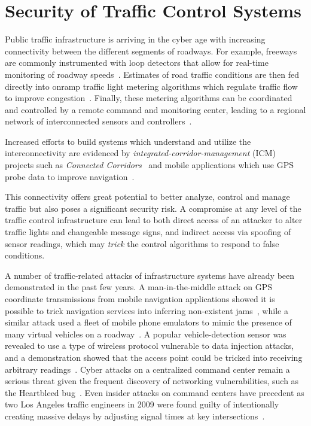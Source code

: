 \chapter{Security of Traffic Control Systems}
\label{chapter:security}

Public traffic infrastructure is arriving in the cyber age with increasing connectivity between the different segments of roadways. For example, freeways are commonly instrumented with loop detectors that allow for real-time monitoring of roadway speeds~\cite{jia2001pems}. Estimates of road traffic conditions are then fed directly into onramp traffic light metering algorithms which regulate traffic flow to improve congestion~\cite{Papageorgiou1991}. Finally, these metering algorithms can be coordinated and controlled by a remote command and monitoring center, leading to a regional network of interconnected sensors and controllers~\cite{Reilly2013b}.

Increased efforts to build systems which understand and utilize the interconnectivity are evidenced by \emph{integrated-corridor-management} (ICM) projects such as \emph{Connected Corridors}~\cite{miller2010san} and mobile applications which use GPS probe data to improve navigation~\cite{work2010traffic}.

This connectivity offers great potential to better analyze, control and manage traffic but also poses a significant security risk. A compromise at any level of the traffic control infrastructure can lead to both direct access of an attacker to alter traffic lights and changeable message signs, and indirect access via spoofing of sensor readings, which may \emph{trick} the control algorithms to respond to false conditions.

A number of traffic-related attacks of infrastructure systems have already been demonstrated in the past few years. A man-in-the-middle attack on GPS coordinate transmissions from mobile navigation applications showed it is possible to trick navigation services into inferring non-existent jams~\cite{jeske2013floating}, while a similar attack used a fleet of mobile phone emulators to mimic the presence of many virtual vehicles on a roadway~\cite{TUFNELL2014}. A popular vehicle-detection sensor was revealed to use a type of wireless protocol vulnerable to data injection attacks, and a demonstration showed that the access point could be tricked into receiving arbitrary readings~\cite{Zetter2014Custom}. Cyber attacks on a centralized command center remain a serious threat given the frequent discovery of networking vulnerabilities, such as the Heartbleed bug~\cite{Codenomicon2014}. Even insider attacks on command centers have precedent as two Los Angeles traffic engineers in 2009 were found guilty of intentionally creating massive delays by adjusting signal times at key intersections~\cite{Grad2009Custom}.

